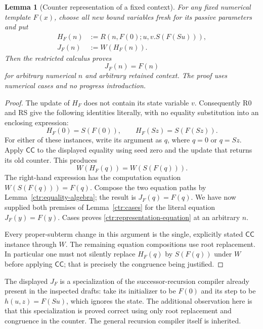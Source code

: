 \documentclass[11pt,letterpaper]{article}
\newtheorem{lemma}[theorem]{Lemma}
\theoremstyle{definition}\newtheorem{definition}[theorem]{Definition}
\theoremstyle{remark}\newtheorem{remark}[theorem]{Remark}
\begin{document}
\begin{lemma}[Counter representation of a fixed context]
\label{ctr:context-representation}
For any fixed numerical template $F(x)$, choose all new bound variables
fresh for its passive parameters and put
\[
 \begin{aligned}
  H_F(n)&:=R(n,F(0);u,v.S(F(Su))),\\
  J_F(n)&:=W(H_F(n)).
 \end{aligned}
 \tag{Counter representation}
\]
Then the restricted calculus proves
\[
                         J_F(n)=F(n)
 \tag{Representation}\label{ctr:representation-equation}
\]
for arbitrary numerical $n$ and arbitrary retained context. The proof
uses numerical cases and no progress introduction.
\end{lemma}
\begin{proof}
The update of $H_F$ does not contain its state variable $v$.
Consequently R0 and RS give the following identities literally, with
no equality substitution into an enclosing expression:
\[
 H_F(0)=S(F(0)),\qquad H_F(Sz)=S(F(Sz)).
 \tag{Two computations}
\]
For either of these instances, write its argument as $q$, where $q=0$
or $q=Sz$. Apply $\mathsf{CC}$ to the displayed equality using seed
zero and the update that returns its old counter. This produces
\[
                 W(H_F(q))=W(S(F(q))).
\]
The right-hand expression has the computation equation
$W(S(F(q)))=F(q)$. Compose the two equation paths by
Lemma~\ref{ctr:equality-algebra}; the result is
$J_F(q)=F(q)$. We have now supplied both premises of
Lemma~\ref{ctr:cases} for the literal equation
$J_F(y)=F(y)$. Cases proves
\eqref{ctr:representation-equation} at an arbitrary $n$.

Every proper-subterm change in this argument is the single, explicitly
stated $\mathsf{CC}$ instance through $W$. The remaining equation
compositions use root replacement. In particular one must not silently
replace $H_F(q)$ by $S(F(q))$ under $W$ before applying
$\mathsf{CC}$; that is precisely the congruence being justified.
\end{proof}

The displayed $J_F$ is a specialization of the successor-recursion
compiler already present in the inspected drafts: take its initializer
to be $F(0)$ and its step to be $h(u,z)=F(Su)$, which ignores the state.
The additional observation here is that this specialization is proved
correct using only root replacement and congruence in the counter.
The general recursion compiler itself is inherited.
\end{document}
